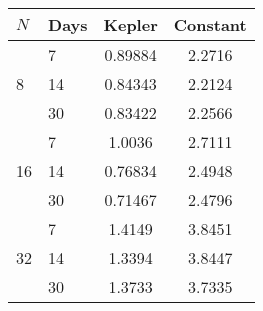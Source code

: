 \begin{tabular}{l|lcc}
\hline
$N$ & Days & Kepler & Constant \\
\hline
\multirow{3}{*}{8} & 7 & 0.89884 & 2.2716 \\ 
&14 & 0.84343 & 2.2124 \\ 
&30 & 0.83422 & 2.2566 \\  \hline
\multirow{3}{*}{16} & 7 & 1.0036 & 2.7111 \\ 
&14 & 0.76834 & 2.4948 \\ 
&30 & 0.71467 & 2.4796 \\  \hline
\multirow{3}{*}{32} & 7 & 1.4149 & 3.8451 \\ 
&14 & 1.3394 & 3.8447 \\ 
&30 & 1.3733 & 3.7335 \\ 
\hline
\end{tabular}